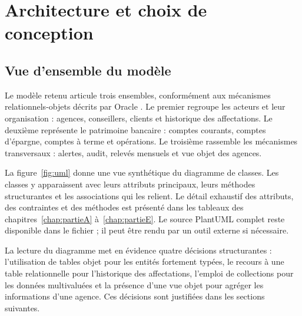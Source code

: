 \chapter{Architecture et choix de conception}
\label{chap:architecture}

\section{Vue d'ensemble du modèle}

Le modèle retenu articule trois ensembles, conformément aux mécanismes
relationnels-objets décrits par Oracle \cite{oracleORD}. Le premier regroupe les acteurs et
leur organisation : agences, conseillers, clients et historique des
affectations. Le deuxième représente le patrimoine bancaire : comptes courants,
comptes d'épargne, comptes à terme et opérations. Le troisième rassemble les
mécanismes transversaux : alertes, audit, relevés mensuels et vue objet des
agences.

La figure~\ref{fig:uml} donne une vue synthétique du diagramme de classes. Les
classes y apparaissent avec leurs attributs principaux, leurs méthodes
structurantes et les associations qui les relient. Le détail exhaustif des
attributs, des contraintes et des méthodes est présenté dans les tableaux des
chapitres~\ref{chap:partieA} à~\ref{chap:partieE}. Le source PlantUML complet
reste disponible dans le fichier  ; il peut être rendu
par un outil externe si nécessaire.

\begin{landscape}
\thispagestyle{plain}
\begin{center}
\vspace*{0.2cm}
\resizebox{0.88\linewidth}{!}{}
\label{fig:uml}
\end{center}
\end{landscape}

La lecture du diagramme met en évidence quatre décisions structurantes :
l'utilisation de tables objet pour les entités fortement typées, le recours à
une table relationnelle pour l'historique des affectations, l'emploi de
collections pour les données multivaluées et la présence d'une vue objet pour
agréger les informations d'une agence. Ces décisions sont justifiées dans les
sections suivantes.

